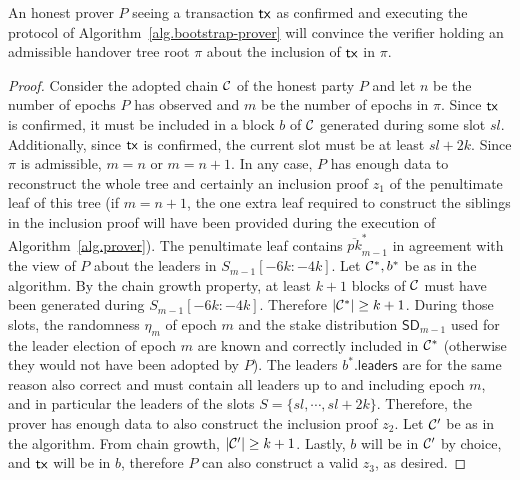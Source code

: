 \begin{lemma}
  An honest prover $P$
  seeing a transaction $\mathsf{tx}$ as confirmed and
  executing the protocol of Algorithm~\ref{alg.bootstrap-prover}
  will convince the verifier holding an admissible handover tree root $\pi$
  about the inclusion of $\mathsf{tx}$ in $\pi$.
\end{lemma}
\begin{proof}
  Consider the adopted chain $\mathcal{C}$ of the honest party $P$ and let $n$ be the number
  of epochs $P$ has observed and $m$ be the number of epochs in $\pi$.
  Since $\mathsf{tx}$ is confirmed, it must be included
  in a block $b$ of $\mathcal{C}$ generated during some slot $sl$.
  Additionally, since $\mathsf{tx}$ is confirmed, the current slot must be at least $sl + 2k$.
  Since $\pi$ is admissible, $m = n$ or $m = n + 1$.
  In any case, $P$ has enough data to reconstruct the whole tree
  and certainly an inclusion proof $z_1$ of
  the penultimate leaf of this tree (if $m = n+1$,
  the one extra leaf required to construct the siblings in the inclusion proof
  will have been provided during the execution of Algorithm~\ref{alg.prover}).
  The penultimate leaf contains $\overline{pk}^*_{m-1}$ in agreement
  with the view of $P$ about the leaders in $S_{m-1}[-6k{:}-4k]$.
  Let $\mathcal{C}^*, b^*$ be as in the algorithm.
  By the chain growth property, at least $k+1$ blocks of $\mathcal{C}$
  must have been generated during $S_{m-1}[-6k{:}-4k]$.
  Therefore $|\mathcal{C}^*| \geq k + 1$.
  During those slots, the randomness $\eta_m$ of epoch $m$
  and the stake distribution $\textsf{SD}_{m-1}$ used for the leader election
  of epoch $m$ are known and correctly included in $\mathcal{C}^*$
  (otherwise they would not have been adopted by $P$).
  The leaders $b^*\textsf{.leaders}$ are for the same reason also correct
  and must contain all leaders up to and including epoch $m$, and
  in particular the leaders of the slots $S = \{sl, \cdots, sl + 2k\}$.
  Therefore, the prover has enough data to also construct the inclusion
  proof $z_2$. Let $\mathcal{C}'$ be as in the algorithm. From chain growth,
  $|\mathcal{C}'| \geq k + 1$. Lastly, $b$ will be in $\mathcal{C}'$ by choice,
  and $\mathsf{tx}$ will be in $b$, therefore $P$ can also construct a valid $z_3$,
  as desired.


\end{proof}
